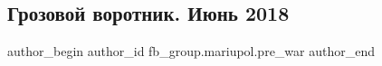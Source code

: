  
 
 
 
 

\subsection{Грозовой воротник. Июнь 2018}
\label{sec:17_02_2023.fb.fb_group.mariupol.pre_war.3.grozovoi_vorotnik__i}

\ifcmt
 author_begin
   author_id fb_group.mariupol.pre_war
 author_end
\fi
